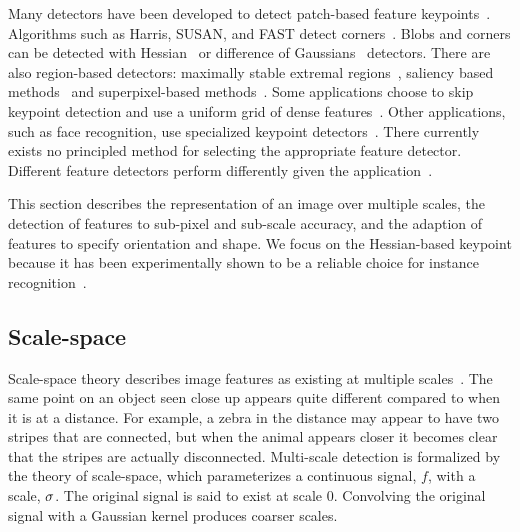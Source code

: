     Many detectors have been developed to detect patch-based feature keypoints~\cite{mikolajczyk_comparison_2005,
    tuytelaars_local_2008}. Algorithms such as Harris, SUSAN, and FAST detect corners~\cite{harris_combined_1988,
    mikolajczyk_indexing_2001, smith_susannew_1997, rosten_machine_2006}. Blobs and corners can be detected with
    Hessian~\cite{beaudet_rotationally_1978, lindeberg_shape_adapted_1994} or difference of
    Gaussians~\cite{gaussier_neural_1992, lowe_distinctive_2004} detectors. There are also region-based detectors:
    maximally stable extremal regions~\cite{matas_robust_2004}, saliency based
    methods~\cite{buoncompagni_saliency_based_2015} and superpixel-based methods~\cite{ren_learning_2003,
    mori_recovering_2004}. Some applications choose to skip keypoint detection and use a uniform grid of dense
    features~\cite{liu_sift_2008, revaud_deep_2015, iscen_comparison_2015}. Other applications, such as face
    recognition, use specialized keypoint detectors~\cite{dantone_real_time_2012, berg_tom_vs_pete_2012}. There
    currently exists no principled method for selecting the appropriate feature detector. Different feature
    detectors perform differently given the application~\cite{tuytelaars_local_2008}.

    This section describes the representation of an image over multiple scales, the detection of features to
    sub-pixel and sub-scale accuracy, and the adaption of features to specify orientation and shape. We focus on
    the Hessian-based keypoint because it has been experimentally shown to be a reliable choice for instance
    recognition~\cite{tuytelaars_local_2008}.

   \subsection{Scale-space}
        Scale-space theory describes image features as existing at multiple
        scales~\cite{lindeberg_scale_space_1993}. The same point on an object seen close up appears quite different
        compared to when it is at a distance. For example, a zebra in the distance may appear to have two stripes
        that are connected, but when the animal appears closer it becomes clear that the stripes are actually
        disconnected.
        Multi-scale detection is formalized by the theory of scale-space, which parameterizes a continuous signal,
        $f$, with a scale, $\sigma$. The original signal is said to exist at scale $0$. Convolving the original
        signal with a Gaussian kernel produces coarser scales.

